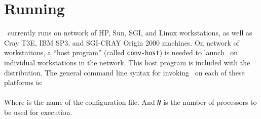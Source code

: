 
%
%
%
%
%
%
%
%
%
%
%
%
%
% 

\section{Running \NAMD}
\label{section:run}

\NAMD\ currently runs on network of HP, Sun, SGI, and Linux workstations, as
well as Cray T3E, IBM SP3, and SGI-CRAY Origin 2000 machines. On network
of workstations, a ``host program'' (called {\tt conv-host}) is needed to
launch \NAMD\ on individual workstations in the network. This host program
is included with the distribution. The general command line syntax for
invoking \NAMD\ on each of these platforms is:\\
\\
Where {\tt <config-file>} is the name of the configuration file. 
And {\tt{\em N}} is the number of processors to be used for execution.

